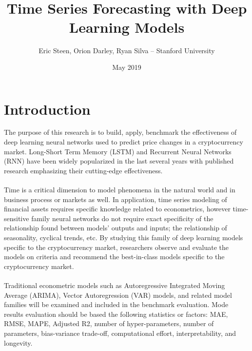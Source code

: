 \documentclass{article}
\title{Time Series Forecasting with Deep Learning Models}
\author{Eric Steen, Orion Darley, Ryan Silva – Stanford University }
\date{May 2019}
\begin{document}
\maketitle

\section{Introduction}
The purpose of this research is to build, apply, benchmark the effectiveness of deep learning neural networks used to predict price changes in a cryptocurrency market. Long-Short Term Memory (LSTM) and Recurrent Neural Networks (RNN) have been widely popularized in the last several years with published research emphasizing their cutting-edge effectiveness.
\paragraph{}
Time is a critical dimension to model phenomena in the natural world and in business process or markets as well. In application, time series modeling of financial assets requires specific knowledge related to econometrics, however time-sensitive family neural networks do not require exact specificity of the relationship found between models’ outputs and inputs; the relationship of seasonality, cyclical trends, etc. By studying this family of deep learning models specific to the cryptocurrency market, researchers observe and evaluate the models on criteria and recommend the best-in-class models specific to the cryptocurrency market.
\paragraph{}
Traditional econometric models such as Autoregressive Integrated Moving Average (ARIMA), Vector Autoregression (VAR) models, and related model families will be examined and included in the benchmark evaluation. Mode results evaluation should be based the following statistics or factors: MAE, RMSE, MAPE, Adjusted R2, number of hyper-parameters, number of parameters, bias-variance trade-off, computational effort, interpretability, and longevity.
\end{document}
